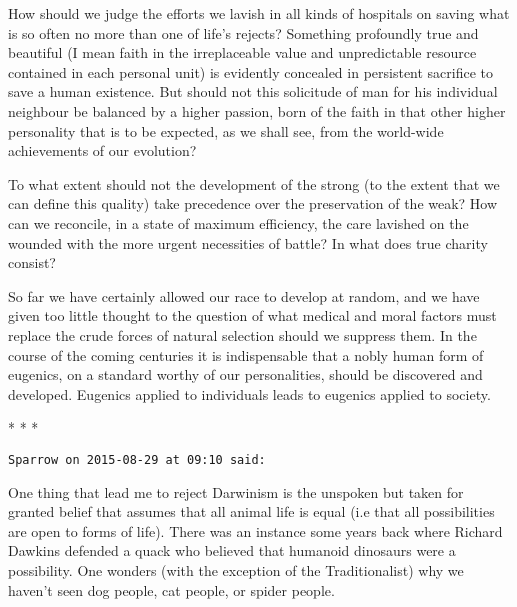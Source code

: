 \begin{quotex}
How should we judge the efforts we lavish in all kinds of hospitals on saving what is so often no more than one of life's rejects? Something profoundly true and beautiful (I mean faith in the irreplaceable value and unpredictable resource contained in each personal unit) is evidently concealed in persistent sacrifice to save a human existence. But should not this solicitude of man for his individual neighbour be balanced by a higher passion, born of the faith in that other higher personality that is to be expected, as we shall see, from the world-wide achievements of our evolution?

To what extent should not the development of the strong (to the extent that we can define this quality) take precedence over the preservation of the weak? How can we reconcile, in a state of maximum efficiency, the care lavished on the wounded with the more urgent necessities of battle? In what does true charity consist?


So far we have certainly allowed our race to develop at random, and we have given too little thought to the question of what medical and moral factors must replace the crude forces of natural selection should we suppress them. In the course of the coming centuries it is indispensable that a nobly human form of eugenics, on a standard worthy of our personalities, should be discovered and developed. Eugenics applied to individuals leads to eugenics applied to society.


\end{quotex}



\begin{center}* * *\end{center}

\begin{footnotesize}\begin{sffamily}



\texttt{Sparrow on 2015-08-29 at 09:10 said: }

One thing that lead me to reject Darwinism is the unspoken but taken for granted belief that assumes that all animal life is equal (i.e that all possibilities are open to forms of life). There was an instance some years back where Richard Dawkins defended a quack who believed that humanoid dinosaurs were a possibility. One wonders (with the exception of the Traditionalist) why we haven't seen dog people, cat people, or spider people.


\end{sffamily}\end{footnotesize}
